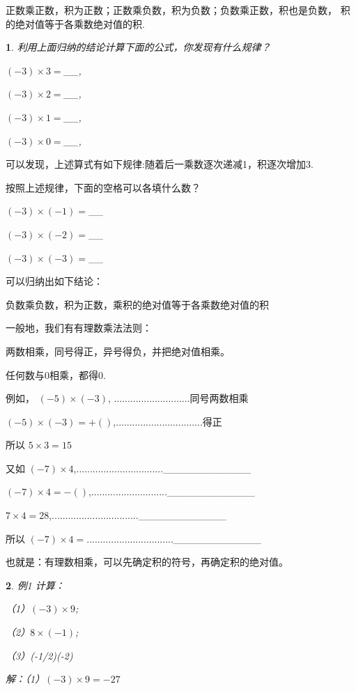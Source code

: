 \documentclass{article}
\newtheorem{example}{ }
\begin{document}
\begin{article}
正数乘正数，积为正数；正数乘负数，积为负数；负数乘正数，积也是负数，
积的绝对值等于各乘数绝对值的积.

\begin{example}

利用上面归纳的结论计算下面的公式，你发现有什么规律？

$(-3)\times3=$__,

$(-3)\times2=$__,

$(-3)\times1=$__,

$(-3)\times0=$__,

\end{example}

可以发现，上述算式有如下规律:随着后一乘数逐次递减1，积逐次增加3.

按照上述规律，下面的空格可以各填什么数？

$(-3)\times(-1)=$__

$(-3)\times(-2)=$__

$(-3)\times(-3)=$__

可以归纳出如下结论：

负数乘负数，积为正数，乘积的绝对值等于各乘数绝对值的积

一般地，我们有有理数乘法法则：

两数相乘，同号得正，异号得负，并把绝对值相乘。

任何数与0相乘，都得0.

例如，  $(-5)\times(-3)$, ............................同号两数相乘

        $(-5)\times(-3)=+( )$,................................得正
        
所以    $5\times3=15$

又如    $(-7)\times4$,................................____________

        $(-7)\times4=-()$,............................____________
        
        $7\times4=28$,................................____________
        
所以    $(-7)\times4=$................................____________        

也就是：有理数相乘，可以先确定积的符号，再确定积的绝对值。

\begin{example}

例1 计算：

（1）$(-3)\times9$;

（2）$8\times(-1)$;

（3）(-1/2)\times(-2)

解：（1）$(-3)\times9=-27$


\end{example}
\end{article}
\end{document}
